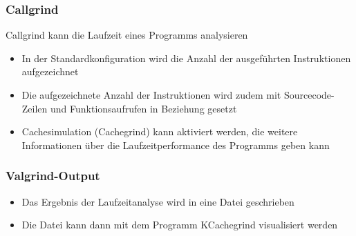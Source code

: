 \subsubsection{Callgrind}
Callgrind kann die Laufzeit eines Programms analysieren
\begin{itemize}
    \item In der Standardkonfiguration wird die Anzahl der ausgeführten Instruktionen aufgezeichnet
    \item Die aufgezeichnete Anzahl der Instruktionen wird zudem mit Sourcecode-Zeilen und Funktionsaufrufen in Beziehung gesetzt
    \item Cachesimulation (Cachegrind) kann aktiviert werden, die weitere Informationen über die Laufzeitperformance des Programms geben kann    
\end{itemize}
\subsubsection{Valgrind-Output}
\begin{itemize}
    \item Das Ergebnis der Laufzeitanalyse wird in eine Datei geschrieben
    \item Die Datei kann dann mit dem Programm KCachegrind visualisiert werden
\end{itemize}


